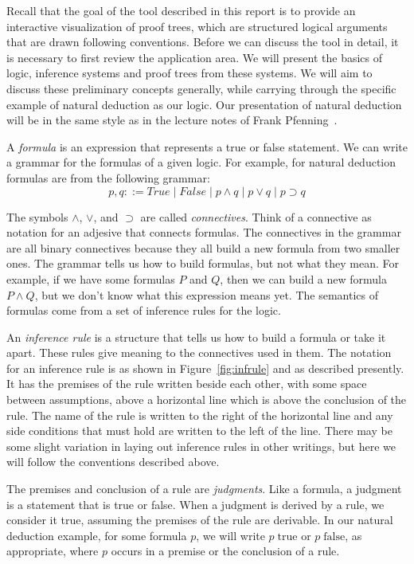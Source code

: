 \documentclass[conference]{IEEEtran}
\begin{document}
Recall that the goal of the tool described in this report is to provide an interactive visualization of proof trees, which are structured logical arguments that are drawn following conventions. Before we can discuss the tool in detail, it is necessary to first review the application area. We will present the basics of logic, inference systems and proof trees from these systems. We will aim to discuss these preliminary concepts generally, while carrying through the specific example of natural deduction as our logic. Our presentation of natural deduction will be in the same style as in the lecture notes of Frank Pfenning~\cite{natded-pfenning}.

A \textit{formula} is an expression that represents a true or false statement. We can write a grammar for the formulas of a given logic. For example, for natural deduction formulas are from the following grammar:
$$
p, q ::= \mathit{True} \; | \; \mathit{False} \; | \; p \wedge q \; | \; p \vee q \; | \; p \supset q
$$

The symbols $\wedge$, $\vee$, and $\supset$ are called \textit{connectives}. Think of a connective as notation for an adjesive that connects formulas. The connectives in the grammar are all binary connectives because they all build a new formula from two smaller ones. The grammar tells us how to build formulas, but not what they mean. For example, if we have some formulas $P$ and $Q$, then we can build a new formula $P \wedge Q$, but we don't know what this expression means yet. The semantics of formulas come from a set of inference rules for the logic.

An \textit{inference rule} is a structure that tells us how to build a formula or take it apart. These rules give meaning to the connectives used in them. The notation for an inference rule is as shown in Figure~\ref{fig:infrule} and as described presently. It has the premises of the rule written beside each other, with some space between assumptions, above a horizontal line which is above the conclusion of the rule. The name of the rule is written to the right of the horizontal line and any side conditions that must hold are written to the left of the line. There may be some slight variation in laying out inference rules in other writings, but here we will follow the conventions described above.

The premises and conclusion of a rule are \textit{judgments}. Like a formula, a judgment is a statement that is true or false. When a judgment is derived by a rule, we consider it true, assuming the premises of the rule are derivable. In our natural deduction example, for some formula $p$, we will write $p \; \mathrm{true}$ or $p \; \mathrm{false}$, as appropriate, where $p$ occurs in a premise or the conclusion of a rule. %
\end{document}
